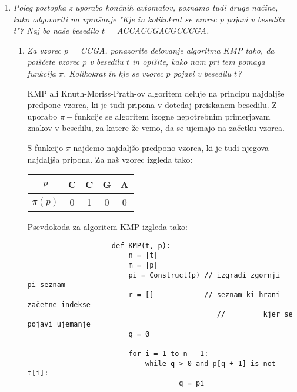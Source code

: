 \documentclass{article}
\begin{document}
\begin{enumerate}

	\item \textit{Poleg postopka z uporabo končnih avtomatov, poznamo tudi druge načine, kako
			odgovoriti na vprašanje "Kje in kolikokrat se vzorec p pojavi v besedilu t"? Naj bo naše
		besedilo $t$ = ACCACCGACGCCCGA.}

		\begin{enumerate}
			\item \textit{Za vzorec $p$ = CCGA, ponazorite delovanje algoritma KMP tako, da poiščete
					vzorec $p$ v besedilu $t$ in opišite, kako nam pri tem pomaga funkcija $\pi$.
				Kolikokrat in kje se vzorec $p$ pojavi v besedilu $t$?}

				KMP ali Knuth-Moriss-Prath-ov algoritem deluje na principu najdaljše predpone vzorca,
				ki je tudi pripona v dotedaj preiskanem besedilu. Z uporabo $\pi-$funkcije se
				algoritem izogne nepotrebnim primerjavam znakov v besedilu, za katere že vemo, da
				se ujemajo na začetku vzorca.

				S funkcijo $\pi$ najdemo najdaljšo predpono vzorca, ki je tudi njegova najdaljša
				pripona. Za naš vzorec izgleda tako:

				\begin{center}
					\begin{tabular}{c|c c c c}
						$p$ & C & C & G & A \\
						\hline
						$\pi(p)$ & 0 & 1 & 0 & 0 \\
					\end{tabular}
				\end{center}

				Psevdokoda za algoritem KMP izgleda tako:

				\begin{verbatim}
					def KMP(t, p):
						n = |t|
						m = |p|
						pi = Construct(p) // izgradi zgornji pi-seznam
						r = []            // seznam ki hrani začetne indekse
											 //         kjer se pojavi ujemanje
						q = 0

						for i = 1 to n - 1:
							while q > 0 and p[q + 1] is not t[i]:
									q = pi


\end{verbatim}
\end{enumerate}
\end{enumerate}
\end{document}
